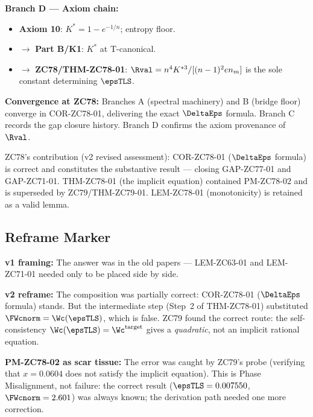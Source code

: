 \documentclass[12pt, a4paper]{article}
\begin{document}
\begin{genealogybox}[title={How ZC78's Key Objects Trace Back}]
\textbf{Branch D --- Axiom chain:}
\begin{itemize}[leftmargin=2em, noitemsep]
  \item \textbf{Axiom 10}: $K^* = 1 - e^{-1/n}$; entropy floor.
  \item $\to$ \textbf{Part B/K1}: $K^*$ at T-canonical.
  \item $\to$ \textbf{ZC78/THM-ZC78-01}: $\Rval = n^4 K^{*3}/[(n-1)^2 e n_m]$
    is the sole constant determining $\epsTLS$.
\end{itemize}

\textbf{Convergence at ZC78:}
Branches A (spectral machinery) and B (bridge floor) converge
in COR-ZC78-01, delivering the exact $\DeltaEps$ formula.
Branch C records the gap closure history. Branch D confirms
the axiom provenance of $\Rval$.

ZC78's contribution (v2 revised assessment):
COR-ZC78-01 ($\DeltaEps$ formula) is correct and constitutes
the substantive result --- closing GAP-ZC77-01 and GAP-ZC71-01.
THM-ZC78-01 (the implicit equation) contained PM-ZC78-02 and
is superseded by ZC79/THM-ZC79-01.
LEM-ZC78-01 (monotonicity) is retained as a valid lemma.
\end{genealogybox}

\subsection{Reframe Marker}
\label{sec:reframe}

\begin{derivedbox}[title={Reframe v2: ``composition'' $\to$ ``composition
  with a substitution error''}]
\textbf{v1 framing:}
The answer was in the old papers --- LEM-ZC63-01 and LEM-ZC71-01
needed only to be placed side by side.

\textbf{v2 reframe:}
The composition was partially correct: COR-ZC78-01 ($\DeltaEps$
formula) stands. But the intermediate step (Step~2 of THM-ZC78-01)
substituted $\FWcnorm = \Wc(\epsTLS)$, which is false.
ZC79 found the correct route: the self-consistency
$\Wc(\epsTLS) = \Wc^{\rm target}$ gives a \emph{quadratic},
not an implicit rational equation.

\textbf{PM-ZC78-02 as scar tissue:}
The error was caught by ZC79's probe (verifying that
$x = 0.0604$ does not satisfy the implicit equation).
This is Phase Misalignment, not failure:
the correct result ($\epsTLS = 0.007550$, $\FWcnorm = 2.601$)
was always known; the derivation path needed one more correction.
\end{derivedbox}
\end{document}
